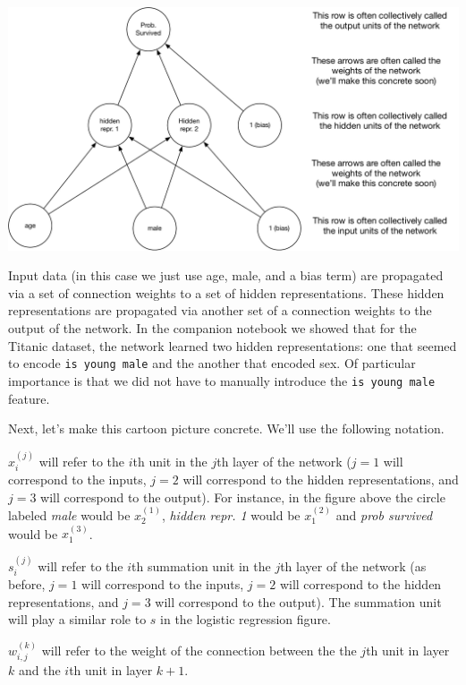 \documentclass[assignment06_Solutions]{subfiles}
\begin{document}
\includegraphics[width=\linewidth]{figures/titanicmlpsimple}

Input data (in this case we just use age, male, and a bias term) are propagated via a set of connection weights to a set of hidden representations.  These hidden representations are propagated via another set of a connection weights to the output of the network.   In the companion notebook we showed that for the Titanic dataset, the network learned two hidden representations: one that seemed to encode {\tt is young male} and the another that encoded sex.  Of particular importance is that we did not have to manually introduce the {\tt is young male} feature.

Next, let's make this cartoon picture concrete.  We'll use the following notation.
\bi
\item $x^{(j)}_i$ will refer to the $i$th unit in the $j$th layer of the network ($j=1$ will correspond to the inputs, $j=2$ will correspond to the hidden representations, and $j=3$ will correspond to the output).  For instance, in the figure above the circle labeled \emph{male} would be $x^{(1)}_2$, \emph{hidden repr. 1} would be $x^{(2)}_1$ and \emph{prob survived} would be $x^{(3)}_1$.
\item $s^{(j)}_i$ will refer to the $i$th summation unit in the $j$th layer of the network (as before, $j=1$ will correspond to the inputs, $j=2$ will correspond to the hidden representations, and $j=3$ will correspond to the output).  The summation unit will play a similar role to $s$ in the logistic regression figure.
\item $w^{(k)}_{i,j}$ will refer to the weight of the connection between the the $j$th unit in layer $k$ and the $i$th unit in layer $k+1$.
\ei
\end{document}
